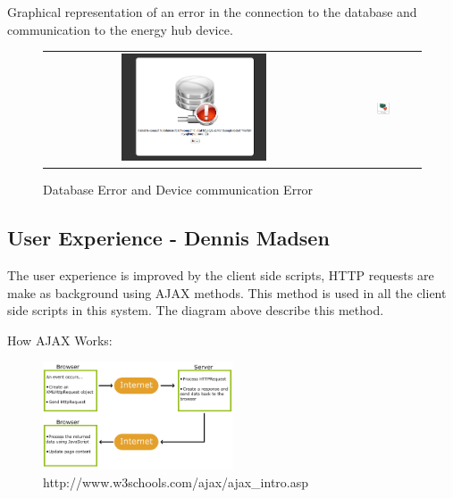%

Graphical representation of an error in the connection to the database and communication to the energy hub device.
\begin{figure}[H]
	\begin{tabular}{ c c }
		\includegraphics[width=0.5\textwidth]{images/error_db.png}
&
		\includegraphics[width=0.2\textwidth]{images/error_device.png}
\end{tabular}
\caption{Database Error and Device communication Error}
\end{figure} 

\subsection{User Experience - Dennis Madsen}
The user experience is improved by the client side scripts, HTTP requests are make as background using AJAX methods. This method is used in all the client side scripts in this system. The diagram above describe this method.

How AJAX Works:

\begin{figure}[H]
	\begin{centering}
		\includegraphics[width=0.5\textwidth]{images/ajax.png}
		\caption{http://www.w3schools.com/ajax/ajax\_intro.asp}
	\end{centering}
\end{figure}

